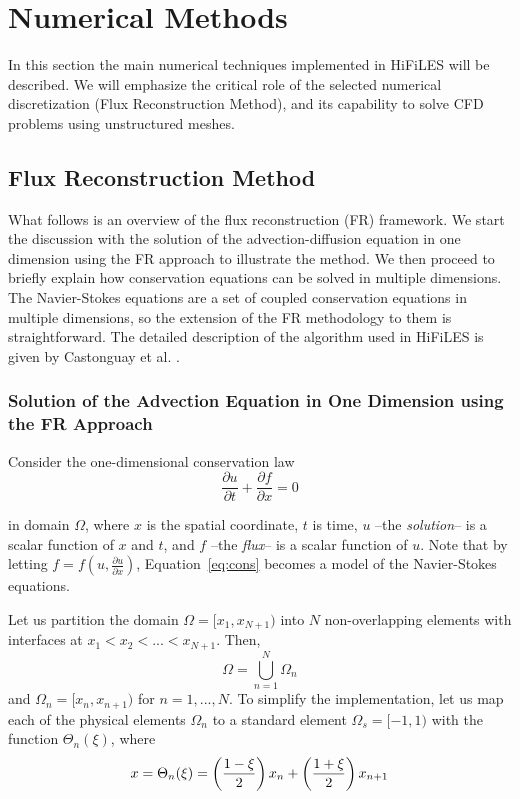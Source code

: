 
\section{Numerical Methods}
\label{sec:numerics}

In this section the main numerical techniques implemented in HiFiLES will be described. We will emphasize the critical role of the selected numerical discretization (Flux Reconstruction Method), and its capability to solve CFD problems using unstructured meshes. 

\subsection{Flux Reconstruction Method}

What follows is an overview of the flux reconstruction (FR) framework. We start the discussion with the solution of the advection-diffusion equation in one dimension using the FR approach to illustrate the method. We then proceed to briefly explain how conservation equations can be solved in multiple dimensions. The Navier-Stokes equations are a set of coupled conservation equations in multiple dimensions, so the extension of the FR methodology to them is straightforward. The detailed description of the algorithm used in HiFiLES is given by Castonguay et al. \cite{castonguay2011}.

\subsubsection{Solution of the Advection Equation in One Dimension using the FR Approach}

Consider the one-dimensional conservation law
\begin{equation}
\label{eq:cons}
\frac{\partial u}{\partial t} + \frac{\partial f}{\partial x} = 0
\end{equation}

in domain $\Omega$, where $x$ is the spatial coordinate, $t$ is time, $u$ --the \emph{solution}-- is a scalar function of $x$ and $t$, and $f$ --the \emph{flux}-- is a scalar function of $u$. Note that by letting $f = f(u,\frac{\partial u}{\partial x})$, Equation~\ref{eq:cons} becomes a model of the Navier-Stokes equations.

Let us partition the domain $\Omega = [x_1,x_{N+1})$ into $N$ non-overlapping elements with 
interfaces at $x_1<x_2<...<x_{N+1}$. Then,
\begin{equation}
\Omega = \bigcup^N_{n=1} \Omega_n
\end{equation}
and $\Omega_n = [x_n,x_{n+1})$ for $n = 1,...,N$. To simplify the implementation, let us map each of the physical elements $\Omega_n$ to a standard element $\Omega_s=[-1,1)$ with the function $\Theta_n(\xi)$, where
\begin{equation}
x = \Theta_n(\xi) = \left( \frac{1-\xi}{2} \right) x_n + \left(\frac{1+\xi}{2}\right) x_{n+1} 
\end{equation}


